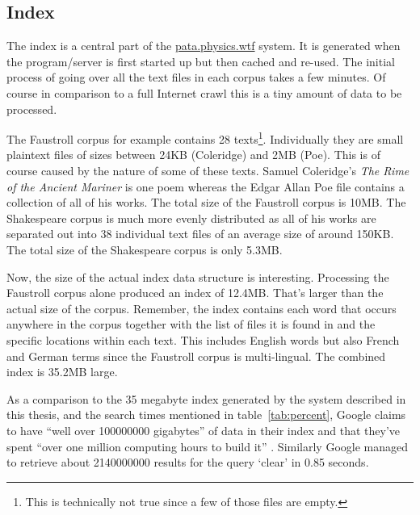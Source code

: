 \subsection{Index}
\label{s:analindex}

The index is a central part of the \url{pata.physics.wtf} system. It is generated when the program/server is first started up but then cached and re-used. The initial process of going over all the text files in each corpus takes a few minutes. Of course in comparison to a full Internet crawl this is a tiny amount of data to be processed. 

The Faustroll corpus for example contains \num{28} texts\footnote{This is technically not true since a few of those files are empty.}. Individually they are small plaintext files of sizes between 24KB (Coleridge) and 2MB (Poe). This is of course caused by the nature of some of these texts. Samuel Coleridge's \textit{The Rime of the Ancient Mariner} is one poem whereas the Edgar Allan Poe file contains a collection of all of his works. The total size of the Faustroll corpus is 10MB. The Shakespeare corpus is much more evenly distributed as all of his works are separated out into 38 individual text files of an average size of around 150KB. The total size of the Shakespeare corpus is only 5.3MB.

Now, the size of the actual index data structure is interesting. Processing the Faustroll corpus alone produced an index of 12.4MB. That's larger than the actual size of the corpus. Remember, the index contains each word that occurs anywhere in the corpus together with the list of files it is found in and the specific locations within each text. This includes English words but also French and German terms since the Faustroll corpus is multi-lingual. The combined index is 35.2MB large.

As a comparison to the 35 megabyte index generated by the system described in this thesis, and the search times mentioned in table~\ref{tab:percent}, Google claims to have ``well over \num{100000000} gigabytes'' of data in their index and that they've spent ``over one million computing hours to build it'' \autocite{GoogleCI}. Similarly Google managed to retrieve about \num{2140000000} results for the query `clear' in 0.85 seconds.

